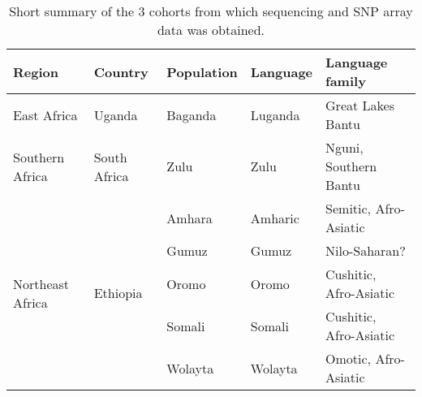 \begin{table}[ht]
\centering
\begin{tabular}{l|l|l|l|l}
Region & Country & Population & Language & Language family \\ \hline
East Africa & Uganda\cite{Asiki01022013} & Baganda & Luganda & Great Lakes Bantu \\ \hline
Southern Africa & South Africa & Zulu & Zulu & Nguni, Southern Bantu \\ \hline
\multirow{5}{*}{Northeast Africa} & \multirow{5}{*}{Ethiopia} & Amhara & Amharic & Semitic, Afro-Asiatic \\
& & Gumuz & Gumuz & Nilo-Saharan? \\
& & Oromo & Oromo & Cushitic, Afro-Asiatic \\
& & Somali & Somali & Cushitic, Afro-Asiatic \\
& & Wolayta & Wolayta & Omotic, Afro-Asiatic \\
\hline
\end{tabular}
\caption{Short summary of the 3 cohorts from which sequencing and SNP array data was obtained.}
\label{tab:short_summary}
\end{table}